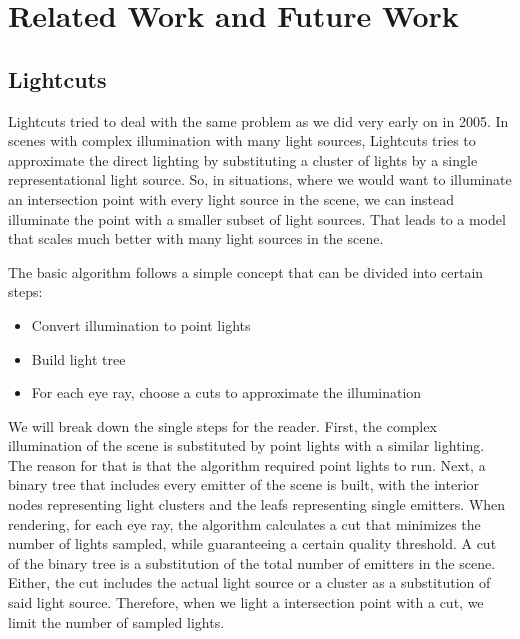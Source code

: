 
\chapter{Related Work and Future Work}
\label{ch:related}

\section{Lightcuts}

Lightcuts \Cite{LCT} tried to deal with the same problem as we did very early on in 2005. In scenes with complex illumination with many light sources, Lightcuts tries to approximate the direct lighting by substituting a cluster of lights by a single representational light source. So, in situations, where we would want to illuminate an intersection point with every light source in the scene, we can instead illuminate the point with a smaller subset of light sources. That leads to a model that scales much better with many light sources in the scene.

The basic algorithm follows a simple concept that can be divided into certain steps:

\begin{itemize}
	\item Convert illumination to point lights
	\item Build light tree
	\item For each eye ray, choose a cuts to approximate the illumination
\end{itemize}

We will break down the single steps for the reader. First, the complex illumination of the scene is substituted by point lights with a similar lighting. The reason for that is that the algorithm required point lights to run. Next, a binary tree that includes every emitter of the scene is built, with the interior nodes representing light clusters and the leafs representing single emitters. When rendering, for each eye ray, the algorithm calculates a cut that minimizes the number of lights sampled, while guaranteeing a certain quality threshold. A cut of the binary tree is a substitution of the total number of emitters in the scene. Either, the cut includes the actual light source or a cluster as a substitution of said light source. Therefore, when we light a intersection point with a cut, we limit the number of sampled lights.

